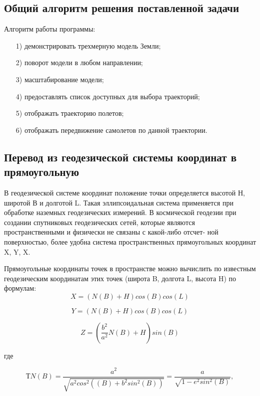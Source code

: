 \documentclass[14pt, a4paper]{extarticle}
\begin{document}
	\subsection{Общий алгоритм решения поставленной задачи}
	Алгоритм работы программы:
	\begin{itemize}
		\item[1)] демонстрировать трехмерную модель Земли;
		\item[2)] поворот модели в любом направлении;
		\item[3)] масштабирование модели;
		\item[4)] предоставлять список доступных для выбора траекторий;
		\item[5)] отображать траекторию полетов;
		\item[6)] отображать передвижение самолетов по данной траектории.
	\end{itemize}
	
	
	\subsection{Перевод из геодезической системы координат в прямоугольную}
	В геодезической системе координат положение точки определяется высотой Н, широтой В и долготой L. Такая эллипсоидальная система применяется при обработке наземных геодезических измерений. В космической геодезии при создании спутниковых геодезических сетей, которые являются пространственными и физически не связаны с какой-либо отсчет- ной поверхностью, более удобна система пространственных прямоугольных координат X, Y, X.\par
	Прямоугольные координаты точек в пространстве можно вычислить по известным геодезическим координатам этих точек (широта B, долгота L, высота H) по формулам:
	\begin{equation}
		X = (N(B) + H) cos(B) cos(L)
	\end{equation}
	
	\begin{equation}
		Y = (N(B) + H) cos(B) cos(L)
	\end{equation}

	\begin{equation}
		Z = (\frac{b^2}{a^2} N(B) + H) sin(B)
	\end{equation}

	где
	
	\begin{equation}
		ТN(B) = \frac{a^2}{\sqrt{a^2 cos^2((B) + b^2 sin^2(B))}} = \frac{a}{\sqrt{1 - e^2 sin^2(B)}},
	\end{equation}
\end{document}
